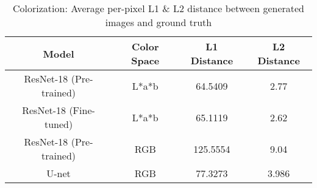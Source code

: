 \begin{table}[!htb]
\centering
\setlength{\tabcolsep}{10pt} %
\renewcommand{\arraystretch}{1.5} %
\begin{tabular}{c | c | c | c}
        \hline
        \textbf{Model} & \textbf{Color Space} & \textbf{
        L1 Distance} & \textbf{L2 Distance}\\
        \hline
        ResNet-18 (Pre-trained) & L*a*b & 64.5409 & 2.77\\
        ResNet-18 (Fine-tuned) & L*a*b & 65.1119 & 2.62\\
        ResNet-18 (Pre-trained) & RGB & 125.5554 & 9.04\\
        U-net & RGB & 77.3273 & 3.986\\
        \hline
    \end{tabular}
\caption{Colorization: Average per-pixel L1 \& L2 distance between generated images and ground truth}
\label{tab:colorization_results}
\end{table}